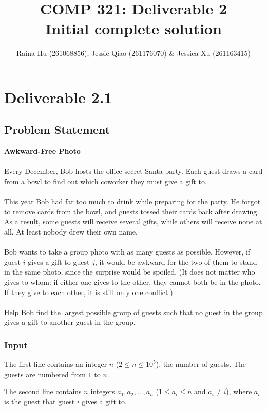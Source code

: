 \documentclass[11pt]{article}
\title{\textbf{COMP 321: Deliverable 2}\\ \Large  Initial complete solution}
\author{Raina Hu (261068856), Jessie Qiao (261176070) \& Jessica Xu (261163415)}
\date{}
\begin{document}
\maketitle

\section*{Deliverable 2.1}

\subsection*{Problem Statement}

\textbf{Awkward-Free Photo}\\\\
Every December, Bob hosts the office secret Santa party. Each guest draws a card from a bowl to find out which coworker they must give a gift to.\\
\\
This year Bob had far too much to drink while preparing for the party. He forgot to remove cards from the bowl, and guests tossed their cards back after drawing. As a result, some guests will receive several gifts, while others will receive none at all. At least nobody drew their own name.\\
\\
Bob wants to take a group photo with as many guests as possible. However, if guest $i$ gives a gift to guest $j$, it would be awkward for the two of them to stand in the same photo, since the surprise would be spoiled. (It does not matter who gives to whom: if either one gives to the other, they cannot both be in the photo. If they give to each other, it is still only one conflict.)\\
\\
Help Bob find the largest possible group of guests such that no guest in the group gives a gift to another guest in the group.

\subsubsection*{Input}

The first line contains an integer $n$ ($2 \le n \le 10^5$), the number of guests. The guests are numbered from $1$ to $n$.

The second line contains $n$ integers $a_1, a_2, \dots, a_n$ ($1 \le a_i \le n$ and $a_i \ne i$), where $a_i$ is the guest that guest $i$ gives a gift to.
\end{document}
